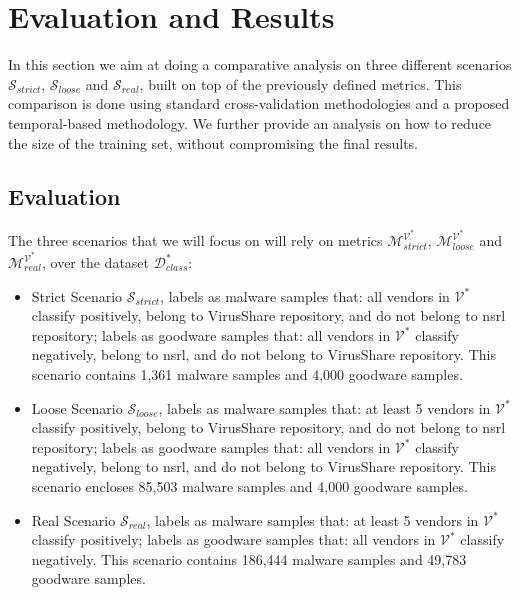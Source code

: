 \color{red}
\section{Evaluation and Results}\label{sec:eval_results}

In this section we aim at doing a comparative analysis on three different scenarios $\mathcal{S}_{strict}$, $\mathcal{S}_{loose}$ and $\mathcal{S}_{real}$, built on top of the previously defined metrics. This comparison is done using standard cross-validation methodologies and a proposed temporal-based methodology. We further provide an analysis on how to reduce the size of the training set, without compromising the final results.

\subsection{Evaluation}

The three scenarios that we will focus on will rely on metrics $\mathcal{M}_{strict}^\mathcal{V^*}$, $\mathcal{M}_{loose}^\mathcal{V^*}$ and $\mathcal{M}_{real}^\mathcal{V^*}$, over the dataset $\mathcal{D}_{class}^*$:

\begin{itemize}
	\item Strict Scenario $\mathcal{S}_{strict}$, labels as malware samples that: all vendors in $\mathcal{V^*}$ classify positively, belong to VirusShare repository, and do not belong to \gls{nsrl} repository; labels as goodware samples that: all vendors in $\mathcal{V^*}$ classify negatively, belong to \gls{nsrl}, and do not belong to VirusShare repository. This scenario contains 1,361 malware samples and 4,000 goodware samples.
	\item Loose Scenario $\mathcal{S}_{loose}$, labels as malware samples that: at least 5 vendors in $\mathcal{V^*}$ classify positively, belong to VirusShare repository, and do not belong to \gls{nsrl} repository; labels as goodware samples that: all vendors in $\mathcal{V^*}$ classify negatively, belong to \gls{nsrl}, and do not belong to VirusShare repository. This scenario encloses 85,503 malware samples and 4,000 goodware samples.
	\item Real Scenario $\mathcal{S}_{real}$, labels as malware samples that: at least 5 vendors in $\mathcal{V^*}$ classify positively; labels as goodware samples that: all vendors in $\mathcal{V^*}$ classify negatively. This scenario contains 186,444 malware samples and 49,783 goodware samples.
\end{itemize}

